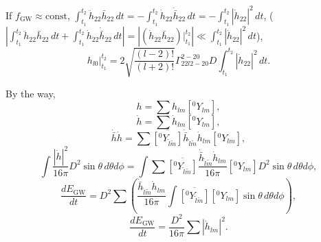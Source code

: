 \documentclass{ctexbeamer}
\begin{document}
    \begin{frame}
        If $f_\text{GW}\approx\text{const}$,
        $\int_{t_1}^{t_2}\ddot{h}_{22}\bar{h}_{22}\,dt
        =-\int_{t_1}^{t_2}\dot{h}_{22}\dot{\bar{h}}_{22}\,dt
        =-\int_{t_1}^{t_2}\left\lvert\dot{h}_{22}\right\rvert^2\,dt$,
        ($\left\lvert\int_{t_1}^{t_2}\ddot{h}_{22}\bar{h}_{22}\,dt+\int_{t_1}^{t_2}\dot{h}_{22}\dot{\bar{h}}_{22}\,dt\right\rvert
        =\left\lvert(\dot{h}_{22}\bar{h}_{22})\vert_{t_1}^{t_2}\right\rvert\ll\int_{t_1}^{t_2}\left\lvert\dot{h}_{22}\right\rvert^2\,dt$),
        \begin{equation}
            h_{l0}\vert_{t_1}^{t_2}=2\sqrt{\frac{(l-2)!}{(l+2)!}}\Gamma^{2-20}_{22l2-20}D\!\int_{t_1}^{t_2}\left\lvert\dot{h}_{22}\right\rvert^2\,dt.
        \end{equation}
    \end{frame}
    \begin{frame}
        By the way,
        \small
        \begin{equation}
            h=\sum h_{lm}\left[{}^0\!Y_{lm}\right],
        \end{equation}
        \begin{equation}
            \dot{h}=\sum \dot{h}_{lm}\left[{}^0\!Y_{lm}\right],
        \end{equation}
        \begin{equation}
            \dot{\bar{h}}\dot{h}=\sum\overline{\left[{}^0\!Y_{\tilde{l}\tilde{m}}\right]}\dot{\bar{h}}_{\tilde{l}\tilde{m}}\dot{h}_{lm}\left[{}^0\!Y_{lm}\right],
        \end{equation}
        \begin{equation}
            \int\frac{\left\lvert\dot{h}\right\rvert^2}{16\pi}D^2\sin\theta\,d\theta d\phi
            =\int\sum\overline{\left[{}^0\!Y_{\tilde{l}\tilde{m}}\right]}\frac{\dot{\bar{h}}_{\tilde{l}\tilde{m}}\dot{h}_{lm}}{16\pi}\left[{}^0\!Y_{lm}\right]D^2\sin\theta\,d\theta d\phi,
        \end{equation}
        \begin{equation}
            \frac{d E_\text{GW}}{dt}
            =D^2\sum\left(\frac{\dot{\bar{h}}_{\tilde{l}\tilde{m}}\dot{h}_{lm}}{16\pi}\int\overline{\left[{}^0\!Y_{\tilde{l}\tilde{m}}\right]}\left[{}^0\!Y_{lm}\right]\sin\theta\,d\theta d\phi\right),
        \end{equation}
        \begin{equation}
            \frac{d E_\text{GW}}{dt}
            =\frac{D^2}{16\pi}\sum\left\lvert \dot{h}_{lm}\right\rvert^2.
        \end{equation}
    \end{frame}
\end{document}
